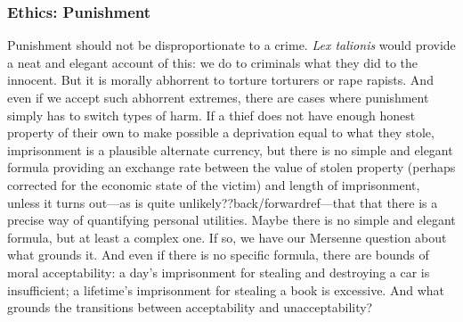 \subsubsection{Ethics: Punishment}
Punishment should not be disproportionate to a crime. \textit{Lex talionis} would provide a neat and elegant account
of this: we do to criminals what they did to the innocent. But it is morally abhorrent to torture torturers or rape rapists. And even if we accept such
abhorrent extremes, there are cases where punishment simply has to switch types of harm. If a thief does not have enough
honest property of their own to make possible a deprivation equal to what they stole, imprisonment is a plausible alternate currency,
but there is no simple and elegant formula providing an exchange rate between the value of stolen property (perhaps
corrected for the economic state of the victim) and length of imprisonment, unless it turns out---as is quite unlikely??back/forwardref---that 
that there is a precise way of quantifying personal utilities. Maybe there is no simple and elegant formula, but at least
a  complex one. If so, we have our Mersenne question about what grounds it. And even if there is no specific formula, there are bounds of moral acceptability: a day's imprisonment for stealing and destroying a car is insufficient; 
a lifetime's imprisonment for stealing a book is excessive. And what grounds the transitions between acceptability
and unacceptability?

